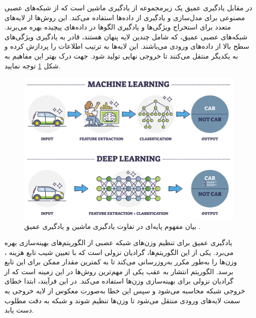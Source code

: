 در مقابل یادگیری عمیق یک زیرمجموعه از یادگیری ماشین است که از شبکه‌های عصبی مصنوعی برای مدل‌سازی و یادگیری از داده‌ها استفاده می‌کند. این روش‌ها از لایه‌های متعدد برای استخراج ویژگی‌ها و یادگیری الگوها در داده‌های پیچیده بهره می‌برند. شبکه‌های عصبی عمیق، که شامل چندین لایه پنهان%
هستند، قادر به یادگیری ویژگی‌های سطح بالا از داده‌های ورودی می‌باشند. این لایه‌ها به ترتیب اطلاعات را پردازش کرده و به یکدیگر منتقل می‌کنند تا خروجی نهایی تولید شود. جهت درک بهتر این مفاهیم به شکل
\ref{machine_learning_vs_deep_learning}
توجه نمایید.


\begin{figure}[t]
	\centering
	\includegraphics[scale=0.28]{images/chap2/machine_learning_vs_deep_learning.png}%
	\caption{%
بیان مفهوم پایه‌ای در تفاوت یادگیری ماشین و یادگیری عمیق
		\cite{AIT2024Deep}.
	}
	\label{machine_learning_vs_deep_learning}
	\centering
\end{figure}



یادگیری عمیق برای تنظیم وزن‌های شبکه عصبی از الگوریتم‌های بهینه‌سازی بهره می‌برد. یکی از این الگوریتم‌ها، گرادیان نزولی%
است که با تعیین شیب تابع هزینه%
%
، وزن‌ها را به‌طور مکرر به‌روزرسانی می‌کند تا به کمترین مقدار ممکن برای این تابع برسد. الگوریتم انتشار به عقب%
یکی از مهم‌ترین روش‌ها در این زمینه است که از گرادیان نزولی برای بهینه‌سازی وزن‌ها استفاده می‌کند. در این فرآیند، ابتدا خطای خروجی شبکه محاسبه می‌شود و سپس این خطا به‌صورت معکوس از لایه خروجی به سمت لایه‌های ورودی منتقل می‌شود تا وزن‌ها تنظیم شوند و شبکه به دقت مطلوب دست یابد.


